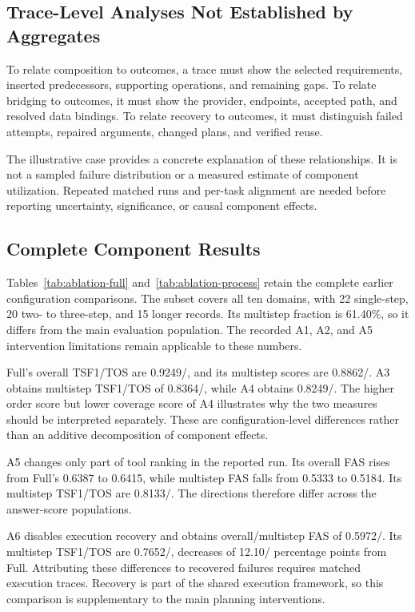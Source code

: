 \subsection{Trace-Level Analyses Not Established by Aggregates}
To relate composition to outcomes, a trace must show the selected requirements, inserted predecessors, supporting operations, and remaining gaps. To relate bridging to outcomes, it must show the provider, endpoints, accepted path, and resolved data bindings. To relate recovery to outcomes, it must distinguish failed attempts, repaired arguments, changed plans, and verified reuse.

The illustrative case provides a concrete explanation of these relationships. It is not a sampled failure distribution or a measured estimate of component utilization. Repeated matched runs and per-task alignment are needed before reporting uncertainty, significance, or causal component effects.

\subsection{Complete Component Results}
\label{app:component-details}
Tables~\ref{tab:ablation-full} and~\ref{tab:ablation-process} retain the complete earlier configuration comparisons. The subset covers all ten domains, with 22 single-step, 20 two- to three-step, and 15 longer records. Its multistep fraction is 61.40\%, so it differs from the main evaluation population. The recorded A1, A2, and A5 intervention limitations remain applicable to these numbers.



Full's overall TSF1/TOS are 0.9249/, and its multistep scores are 0.8862/. A3 obtains multistep TSF1/TOS of 0.8364/, while A4 obtains 0.8249/. The higher order score but lower coverage score of A4 illustrates why the two measures should be interpreted separately. These are configuration-level differences rather than an additive decomposition of component effects.

A5 changes only part of tool ranking in the reported run. Its overall FAS rises from Full's 0.6387 to 0.6415, while multistep FAS falls from 0.5333 to 0.5184. Its multistep TSF1/TOS are 0.8133/. The directions therefore differ across the answer-score populations.

A6 disables execution recovery and obtains overall/multistep FAS of 0.5972/. Its multistep TSF1/TOS are 0.7652/, decreases of 12.10/ percentage points from Full. Attributing these differences to recovered failures requires matched execution traces. Recovery is part of the shared execution framework, so this comparison is supplementary to the main planning interventions.
